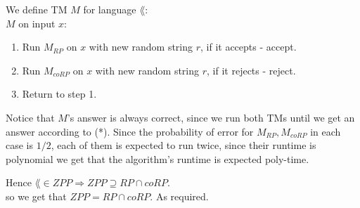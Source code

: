 We define TM $M$ for language $\lang$: \\
$M$ on input $x$:
\begin{enumerate}[1., itemsep=5pt]
    \item Run $M_{RP}$ on $x$ with new random string $r$, if it accepts - accept.
    \item Run $M_{coRP}$ on $x$ with new random string $r$, if it rejects - reject.
    \item Return to step 1.
\end{enumerate}

Notice that $M$'s answer is always correct, since we run both TMs until we get an answer according to (*).
Since the probability of error for $M_{RP}, M_{coRP}$ in each case is $1/2$,
each of them is expected to run twice, since their runtime is polynomial we get that
the algorithm's runtime is expected poly-time.

Hence $\lang \in ZPP \Rightarrow ZPP \supseteq RP \cap coRP$. \\
so we get that $ZPP = RP \cap coRP$. As required.
